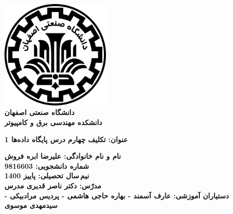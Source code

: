 \begin{titlepage}
\begin{center}
\includegraphics[width=0.4\textwidth]{figures/IUT Logo.png}\\
        
\LARGE
\textbf{دانشگاه صنعتی اصفهان}\\
\textbf{دانشکده مهندسی برق و کامپیوتر}\\
        
\vfill
        
\huge
\textbf{عنوان: تکلیف چهارم درس پایگاه داده‌ها 1}\\
        
\vfill
        
\LARGE
\textbf{نام و نام خانوادگی: علیرضا ابره فروش}\\
\textbf{شماره دانشجویی: 9816603}\\
\textbf{نیم\,سال تحصیلی: پاییز 1400}\\
\textbf{مدرّس: دکتر ناصر قدیری مدرس}\\
\textbf{دستیاران آموزشی: عارف آسمند - بهاره حاجی هاشمی - پردیس مرادبیکی - سیدمهدی موسوی}\\
\end{center}
\end{titlepage}

